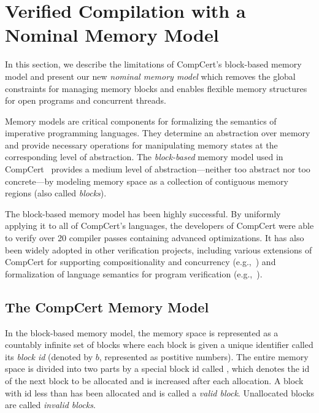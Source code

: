 \section{Verified Compilation with a Nominal Memory Model}
\label{sec:nominal}

In this section, we describe the limitations of CompCert's block-based
memory model and present our new 
{\em nominal memory model} which removes the global constraints for
managing memory blocks and enables flexible memory structures for open
programs and concurrent threads.

Memory models are critical components for formalizing the semantics of
imperative programming languages. They determine an abstraction over
memory and provide necessary operations for manipulating memory states
at the corresponding level of abstraction.
The \emph{block-based} memory model
used in CompCert~\cite{leroy08,compcert-mem-v2}
provides a medium level of
abstraction---neither too abstract nor too concrete---by modeling
memory space as a collection of contiguous memory regions (also called
\emph{blocks}).

The block-based memory model has been highly successful. By uniformly
applying it to all of CompCert's languages, the developers of CompCert
were able to verify over 20 compiler passes containing advanced
optimizations.  It has also been widely adopted in other verification
projects, including various extensions of CompCert for supporting
compositionality and concurrency
(e.g.,~\cite{sevcik13,compcompcert,compcertm,cascompcert,wang2019,compcertelf20,sepcompcert,compcerts})
and formalization of language semantics for program verification
(e.g.,~\cite{appel11:vst,dscal15,ccal18}).

\subsection{The CompCert Memory Model}
\label{ssec:nominal-bbmm}

In the block-based memory model, the memory space is represented as a
countably infinite set of blocks where each block is given a unique
identifier called its \emph{block id} (denoted by $b$, represented
as postitive numbers). The entire memory space is
divided into two parts by a special block id called
\nextblock, which
denotes the id of the next block to be allocated
and is increased after each allocation.
A block with id less than \nextblock has been
allocated and is called a \emph{valid block}.
Unallocated blocks are called \emph{invalid blocks}.

